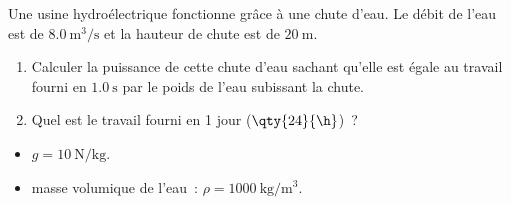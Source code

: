Une usine hydroélectrique fonctionne grâce à une chute d'eau. Le débit de l'eau
est de $\qty{8.0}{\cubic\m\per\s}$ et la hauteur de chute est
de $\qty{20}{\m}$.
\begin{enumerate}
    \item Calculer la puissance de cette chute d'eau sachant qu'elle est égale
          au travail fourni en $\qty{1.0}{\s}$ par le poids de l'eau subissant
          la chute.
    \item Quel est le travail fourni en 1 jour ($\qty{24}{\h}$)~?
\end{enumerate}

\begin{donnees}
    \begin{itemize}
        \item $g=\qty{10}{\N\per\kg}$.
        \item masse volumique de l'eau~: $\rho=\qty{1000}{\kg\per\cubic\m}$.
    \end{itemize}
\end{donnees}

